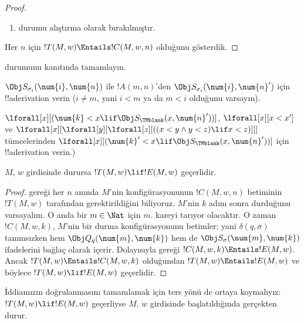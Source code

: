 \documentclass[../../../include/open-logic-section]{subfiles}
\begin{document}
\begin{proof}
\begin{enumerate}
\item {} durumu alıştırma olarak bırakılmıştır.
\end{enumerate}
Her $n$ için $!T(M,w)\Entails !C(M,w,n)$ olduğunu gösterdik.
\end{proof}

\begin{prob}
 durumunu
 kanıtında tamamlayın.
\end{prob}

\begin{prob}
$\Obj S_{\sigma_i}(\num{i},\num{n})$ ile $!A(m,n)$'den
$\Obj S_{\sigma_i}(\num{i},\num{n}')$ için !!a{derivation} verin
($i\neq m$, yani $i<m$ ya da $m<i$ olduğunu varsayın).
\end{prob}

\begin{prob}
$\lforall[x][(\num{k}<x\lif\Obj S_\TMblank(x,\num{n}'))]$,
$\lforall[x][x<x']$ ve
$\lforall[x][\lforall[y][\lforall[z][ ((x < y \land y < z) \lif x <
      z)]]]$ tümcelerinden
$\lforall[x][(\num{k}'<x\lif\Obj S_\TMblank(x,\num{n}'))]$ için
!!a{derivation} verin.)
\end{prob}


\begin{lem}
$M$, $w$ girdisinde durursa $!T(M,w)\lif !E(M,w)$ geçerlidir.
\end{lem}

\begin{proof}
 gereği her $n$ anında $M$'nin konfigürasyonunun
$!C(M,w,n)$ betiminin $!T(M,w)$ tarafından gerektirildiğini biliyoruz.
$M$'nin $k$ adım sonra durduğunu varsayalım. O anda bir $m\in\Nat$ için $m$.
kareyi tarıyor olacaktır. O zaman $!C(M,w,k)$, $M$'nin bir durma
konfigürasyonunu betimler; yani $\delta(q,\sigma)$ tanımsızken hem
$\Obj Q_q(\num{m},\num{k})$ hem de
$\Obj S_\sigma(\num{m},\num{k})$ ifadelerini bağlaç olarak içerir.
Dolayısıyla  gereği
$!C(M,w,k)\Entails !E(M,w)$. Ancak
$!T(M,w)\Entails !C(M,w,k)$ olduğundan $!T(M,w)\Entails !E(M,w)$ ve böylece
$!T(M,w)\lif !E(M,w)$ geçerlidir.
\end{proof}


\begin{explain} 
İddiamızın doğrulanmasını tamamlamak için ters yönü de ortaya koymalıyız:
$!T(M,w)\lif !E(M,w)$ geçerliyse $M$, $w$ girdisinde başlatıldığında
gerçekten durur.
\end{explain}
\end{document}
